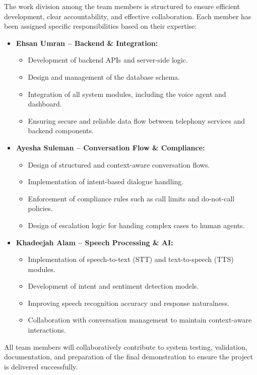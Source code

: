 \documentclass[12pt,a4paper]{report}
\begin{document}
The work division among the team members is structured to ensure efficient development, clear accountability, and effective collaboration. Each member has been assigned specific responsibilities based on their expertise:

\begin{itemize}
    \item \textbf{Ehsan Umran – Backend \& Integration:}
    \begin{itemize}
        \item Development of backend APIs and server-side logic.
        \item Design and management of the database schema.
        \item Integration of all system modules, including the voice agent and dashboard.
        \item Ensuring secure and reliable data flow between telephony services and backend components.
    \end{itemize}

    \item \textbf{Ayesha Suleman – Conversation Flow \& Compliance:}
    \begin{itemize}
        \item Design of structured and context-aware conversation flows.
        \item Implementation of intent-based dialogue handling.
        \item Enforcement of compliance rules such as call limits and do-not-call policies.
        \item Design of escalation logic for handing complex cases to human agents.
    \end{itemize}

    \item \textbf{Khadeejah Alam – Speech Processing \& AI:}
    \begin{itemize}
        \item Implementation of speech-to-text (STT) and text-to-speech (TTS) modules.
        \item Development of intent and sentiment detection models.
        \item Improving speech recognition accuracy and response naturalness.
        \item Collaboration with conversation management to maintain context-aware interactions.
    \end{itemize}
\end{itemize}


All team members will collaboratively contribute to system testing, validation, documentation, and preparation of the final demonstration to ensure the project is delivered successfully.
\end{document}
